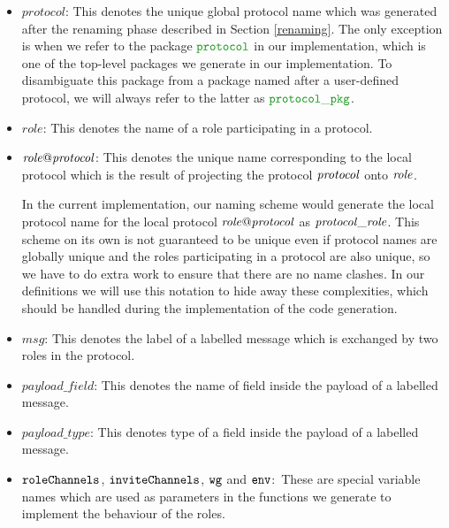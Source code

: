 \documentclass[12pt,twoside]{report}
\begin{document}
\begin{itemize}
    \item $\mathit{protocol}$: This denotes the unique global protocol name which was generated after the renaming phase described in Section \ref{renaming}. The only exception is when we refer to the package $\pkgname{protocol}$ in our implementation, which is one of the top-level packages we generate in our implementation. To disambiguate this package from a package named after a user-defined protocol, we will always refer to the latter as $\pkgname{protocol\_pkg}$.

    \item $\mathit{role}$: This denotes the name of a role participating in a protocol.

    \item $\mathit{\localprotocol{role}{protocol}}$: This denotes the unique name corresponding to the local protocol which is the result of projecting the protocol $\protocolname{protocol}$ onto $\rolename{role}$.
    
    In the current implementation, our naming scheme would generate the local protocol name for the local protocol $\mathit{\localprotocol{role}{protocol}}$ as $\localprotocolname{role}{protocol}$. This scheme on its own is not guaranteed to be unique even if protocol names are globally unique and the roles participating in a protocol are also unique, so we have to do extra work to ensure that there are no name clashes. In our definitions we will use this notation to hide away these complexities, which should be handled during the implementation of the code generation.

    \item $\mathit{msg}$: This denotes the label of a labelled message which is exchanged by two roles in the protocol.
    
    \item $\mathit{payload\_field}$: This denotes the name of field inside the payload of a labelled message.
    
    \item $\mathit{payload\_type}$: This denotes type of a field inside the payload of a labelled message.
    \item $\varname{roleChannels}$, $\varname{inviteChannels}$, $\varname{wg}$ and $\varname{env}$:\, These are special variable names which are used as parameters in the functions we generate to implement the behaviour of the roles.
\end{itemize}
\end{document}
